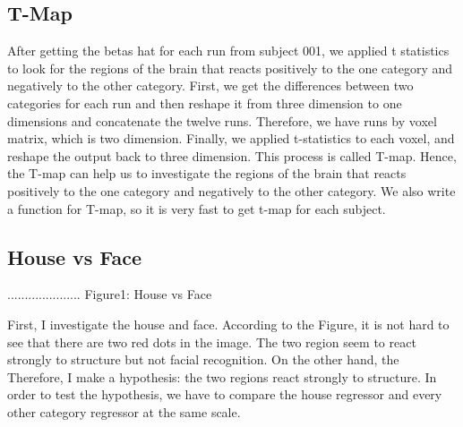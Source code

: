 \documentclass[11pt]{article}
\begin{document}
\subsection{T-Map}
After getting the betas hat for each run from subject 001, we applied t statistics to look for the regions of the brain that reacts positively to the one category and negatively to the other category. First, we get the differences between two categories for each run and then reshape it from three dimension to one dimensions and concatenate the twelve runs. Therefore, we have runs by voxel matrix, which is two dimension.  Finally, we applied t-statistics to each voxel, and reshape the output back to three dimension. This process is called T-map.  Hence, the T-map can help us to investigate the regions of the brain that reacts positively to the one category and negatively to the other category. We also write a function for T-map, so it is very fast to get t-map for  each subject.


\subsection{House vs Face}

\begin{housevsface}
  \centering
    \caption{..................... Figure1: House vs Face}
           
           
First, I investigate the house and face.
According to the Figure, it is not hard to see that there are two red dots in the image. The two region  seem to react strongly to structure but not facial recognition. On the other hand, the  Therefore, I make a hypothesis: the two regions react strongly to structure. In order to test the hypothesis, we have to compare the house regressor and every other category regressor at the same scale. 
\end{housevsface}
\end{document}
